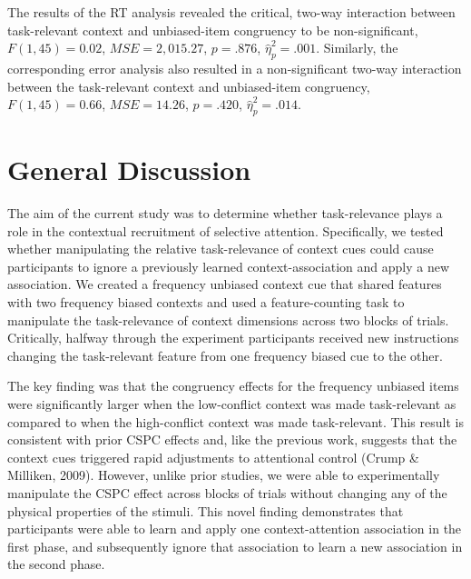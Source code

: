 \documentclass[english,,man,floatsintext]{apa6}
\begin{document}
The results of the RT analysis revealed the critical, two-way interaction between task-relevant context and unbiased-item congruency to be non-significant, \(F(1, 45) = 0.02\), \(\mathit{MSE} = 2,015.27\), \(p = .876\), \(\hat{\eta}^2_p = .001\). Similarly, the corresponding error analysis also resulted in a non-significant two-way interaction between the task-relevant context and unbiased-item congruency, \(F(1, 45) = 0.66\), \(\mathit{MSE} = 14.26\), \(p = .420\), \(\hat{\eta}^2_p = .014\).

\hypertarget{general-discussion}{%
\section{General Discussion}\label{general-discussion}}

The aim of the current study was to determine whether task-relevance plays a role in the contextual recruitment of selective attention. Specifically, we tested whether manipulating the relative task-relevance of context cues could cause participants to ignore a previously learned context-association and apply a new association. We created a frequency unbiased context cue that shared features with two frequency biased contexts and used a feature-counting task to manipulate the task-relevance of context dimensions across two blocks of trials. Critically, halfway through the experiment participants received new instructions changing the task-relevant feature from one frequency biased cue to the other.

The key finding was that the congruency effects for the frequency unbiased items were significantly larger when the low-conflict context was made task-relevant as compared to when the high-conflict context was made task-relevant. This result is consistent with prior CSPC effects and, like the previous work, suggests that the context cues triggered rapid adjustments to attentional control (Crump \& Milliken, 2009). However, unlike prior studies, we were able to experimentally manipulate the CSPC effect across blocks of trials without changing any of the physical properties of the stimuli. This novel finding demonstrates that participants were able to learn and apply one context-attention association in the first phase, and subsequently ignore that association to learn a new association in the second phase.
\end{document}
